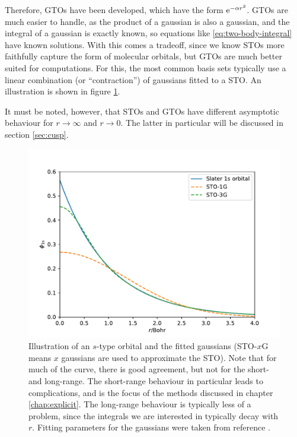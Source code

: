 Therefore, \glspl{GTO} have been developed,\cite{boysElectronic1950} which have the form $\mathrm{e}^{-\alpha r^2}$. \glspl{GTO} are much easier to handle, as the product of a gaussian is also a gaussian, and the integral of a gaussian is exactly known, so equations like \eqref{eq:two-body-integral} have known solutions. With this comes a tradeoff, since we know \glspl{STO} more faithfully capture the form of molecular orbitals, but \glspl{GTO} are much better suited for computations. For this, the most common basis sets typically use a linear combination (or ``contraction'') of gaussians fitted to a \gls{STO}. An illustration is shown in figure \ref{fig:sto-gto}.

It must be noted, however, that \glspl{STO} and \glspl{GTO} have different asymptotic behaviour for $r\to\infty$ and $r\to 0$. The latter in particular will be discussed in section \ref{sec:cusp}.

\begin{figure}[htbp]
    \centering
    \includegraphics{figures/intro/gto-sto.pdf}
    \caption{Illustration of an $s$-type orbital and the fitted gaussians (STO-$x$G means $x$ gaussians are used to approximate the \gls{STO}). Note that for much of the curve, there is good agreement, but not for the short- and long-range. The short-range behaviour in particular leads to complications, and is the focus of the methods discussed in chapter \ref{chap:explicit}. The long-range behaviour is typically less of a problem, since the integrals we are interested in typically decay with $r$. Fitting parameters for the gaussians were taken from reference .}
    \label{fig:sto-gto}
\end{figure}

